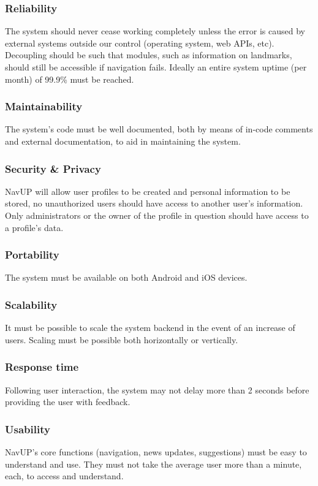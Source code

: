 \documentclass{article}
\begin{document}
		\subsubsection{Reliability} The system should never cease working completely unless the error is caused by external systems outside our control (operating system, web APIs, etc). Decoupling should be such that modules, such as information on landmarks, should still be accessible if navigation fails. Ideally an entire system uptime (per month) of 99.9\% must be reached.
		\subsubsection{Maintainability} The system's code must be well documented, both by means of in-code comments and external documentation, to aid in maintaining the system.
		\subsubsection{Security \& Privacy} NavUP will allow user profiles to be created and personal information to be stored, no unauthorized users should have access to another user's information. Only administrators or the owner of the profile in question should have access to a profile's data.
		\subsubsection{Portability} The system must be available on both Android and iOS devices.
		\subsubsection{Scalability} It must be possible to scale the system backend in the event of an increase of users. Scaling must be possible both horizontally or vertically.
		\subsubsection{Response time} Following user interaction, the system may not delay more than 2 seconds before providing the user with feedback.
		\subsubsection{Usability} NavUP's core functions (navigation, news updates, suggestions) must be easy to understand and use. They must not take the average user more than a minute, each, to access and understand. 
\end{document}
